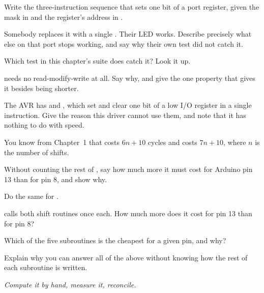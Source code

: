 \label{c2:ex:rmw}
\begin{parts}
  \item Write the three-instruction sequence that sets one bit of a port register, given the mask
    in  and the register's address in .
  \item Somebody replaces it with a single . Their LED works. Describe precisely
    what else on that port stops working, and say why their own test did not catch it.
  \item Which test in this chapter's suite does catch it? Look it up.
  \item {} needs no read-modify-write at all. Say why, and give the one property
    that gives it besides being shorter.
  \item The AVR has  and , which set and clear one bit of a low I/O register in
    a single instruction. Give the reason this driver cannot use them, and note that it has
    nothing to do with speed.
\end{parts}

\label{c2:ex:predict}
You know from Chapter~1 that  costs $6n + 10$ cycles and
 costs $7n + 10$, where $n$ is the number of shifts.
\begin{parts}
  \item Without counting the rest of , say how much more it must cost for Arduino pin
    13 than for pin 8, and show why.
  \item Do the same for .
  \item {} calls both shift routines once each. How much more does it cost for pin 13
    than for pin 8?
  \item Which of the five subroutines is the cheapest for a given pin, and why?
  \item Explain why you can answer all of the above without knowing how the rest of each
    subroutine is written.
\end{parts}

\label{c2:ex:crosscheck}
\emph{Compute it by hand, measure it, reconcile.}

